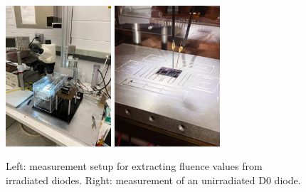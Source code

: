 \begin{figure}[!hbt]
  \begin{center}
    \includegraphics[width=0.35\textwidth]{figures/CVIV_Setup}
    \includegraphics[width=0.35\textwidth]{figures/D0_Measurement}
    \caption{Left: measurement setup for extracting fluence values from irradiated diodes. Right: measurement of an unirradiated D0 diode.}
    \label{fig:Fluence_Measurement_Setup}
  \end{center}
\end{figure}

\fi       %
